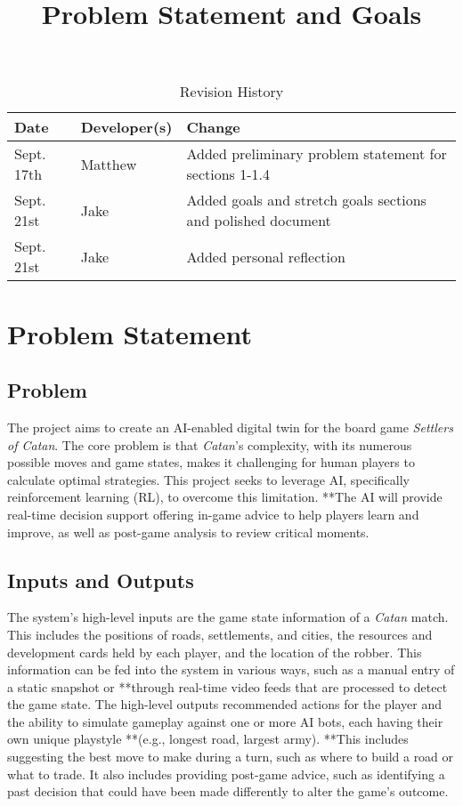 \documentclass{article}
\title{Problem Statement and Goals\\\progname}
\author{\authname}
\date{}
\begin{document}
\maketitle

\begin{table}[hp]
\caption{Revision History} \label{TblRevisionHistory}
\begin{tabularx}{\textwidth}{llX}
\toprule
\textbf{Date} & \textbf{Developer(s)} & \textbf{Change}\\
\midrule
Sept. 17th & Matthew & Added preliminary problem statement for sections 1-1.4\\
Sept. 21st & Jake & Added goals and stretch goals sections and polished document\\
Sept. 21st & Jake & Added personal reflection\\
\bottomrule
\end{tabularx}
\end{table}

\section{Problem Statement}\label{sec:problem-statement}

\subsection{Problem}\label{subsec:problem}
The project aims to create an AI-enabled digital twin for the board game \emph{Settlers of Catan}.
The core problem is that \emph{Catan}'s complexity, with its numerous possible moves and game states, makes it challenging for human players to calculate optimal strategies.
This project seeks to leverage AI, specifically reinforcement learning (RL), to overcome this limitation.
**The AI will provide real-time decision support offering in-game advice to help players learn and improve, as well as post-game analysis to review critical moments.

\subsection{Inputs and Outputs}\label{subsec:inputs-and-outputs}
The system's high-level inputs are the game state information of a \emph{Catan} match.
This includes the positions of roads, settlements, and cities, the resources and development cards held by each player, and the location of the robber.
This information can be fed into the system in various ways, such as a manual entry of a static snapshot or **through real-time video feeds that are processed to detect the game state.
The high-level outputs recommended actions for the player and the ability to simulate gameplay against one or more AI bots, each having their own unique playstyle **(e.g., longest road, largest army).
**This includes suggesting the best move to make during a turn, such as where to build a road or what to trade.
It also includes providing post-game advice, such as identifying a past decision that could have been made differently to alter the game's outcome.
\end{document}
